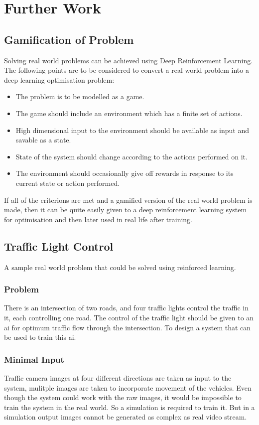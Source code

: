 \documentclass[a4paper,11pt]{report}
\begin{document}
	\newpage
	\chapter{Further Work}
		\section{Gamification of Problem}
			Solving real world problems can be achieved using Deep Reinforcement Learning. The following points are to be considered to convert a real world problem into a deep learning optimisation problem:
			\begin{itemize}
				\setlength\itemsep{0em}
				\item The problem is to be modelled as a game.
				\item The game should include an environment which has a finite set of actions.
				\item High dimensional input to the environment should be available as input and savable as a state.
				\item State of the system should change according to the actions performed on it.
				\item The environment should occasionally give off rewards in response to its current state or action performed.
			\end{itemize}

			If all of the criterions are met and a gamified version of the real world problem is made, then it can be quite easily given to a deep reinforcement learning system for optimisation and then later used in real life after training.

		\section{Traffic Light Control}
				A sample real world problem that could be solved using reinforced learning.
			\subsection{Problem}
				There is an intersection of two roads, and four traffic lights control the traffic in it, each controlling one road. The control of the traffic light should be given to an \ac{ai} for optimum traffic flow through the intersection. To design a system that can be used to train this \ac{ai}. 

			\subsection{Minimal Input}
				Traffic camera images at four different directions are taken as input to the system, mulitple images are taken to incorporate movement of the vehicles. Even though the system could work with the raw images, it would be impossible to train the system in the real world. So a simulation is required to train it. But in a simulation output images cannot be generated as complex as real video stream. 
\end{document}
